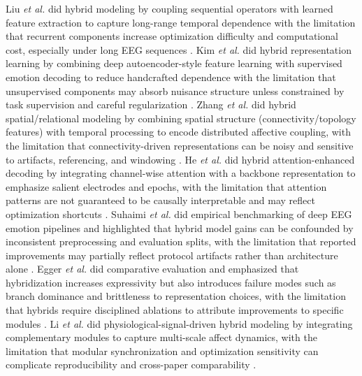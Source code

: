 \documentclass{WileyMSP-template}
\begin{document}
Liu \textit{et al.} did hybrid modeling by coupling sequential operators with learned feature extraction to capture long-range temporal dependence with the limitation that recurrent components increase optimization difficulty and computational cost, especially under long EEG sequences \cite{sliuxw2020subjecti}. Kim \textit{et al.} did hybrid representation learning by combining deep autoencoder-style feature learning with supervised emotion decoding to reduce handcrafted dependence with the limitation that unsupervised components may absorb nuisance structure unless constrained by task supervision and careful regularization \cite{shkimh2021asemoaut}. Zhang \textit{et al.} did hybrid spatial/relational modeling by combining spatial structure (connectivity/topology features) with temporal processing to encode distributed affective coupling, with the limitation that connectivity-driven representations can be noisy and sensitive to artifacts, referencing, and windowing \cite{tzhang2019spatialt}. He \textit{et al.} did hybrid attention-enhanced decoding by integrating channel-wise attention with a backbone representation to emphasize salient electrodes and epochs, with the limitation that attention patterns are not guaranteed to be causally interpretable and may reflect optimization shortcuts \cite{hheand2019channela}. Suhaimi \textit{et al.} did empirical benchmarking of deep EEG emotion pipelines and highlighted that hybrid model gains can be confounded by inconsistent preprocessing and evaluation splits, with the limitation that reported improvements may partially reflect protocol artifacts rather than architecture alone \cite{nssuha2020eegbased}. Egger \textit{et al.} did comparative evaluation and emphasized that hybridization increases expressivity but also introduces failure modes such as branch dominance and brittleness to representation choices, with the limitation that hybrids require disciplined ablations to attribute improvements to specific modules \cite{megger2019emotionr}. Li \textit{et al.} did physiological-signal-driven hybrid modeling by integrating complementary modules to capture multi-scale affect dynamics, with the limitation that modular synchronization and optimization sensitivity can complicate reproducibility and cross-paper comparability \cite{wlizzh2021physiolo}.
\end{document}
